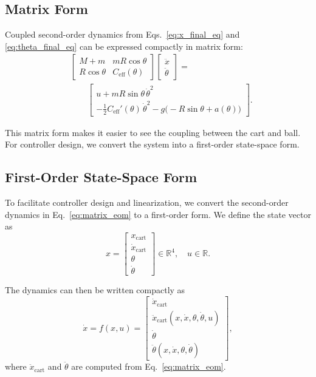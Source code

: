 \subsection{Matrix Form}
Coupled second-order dynamics from Eqs.~\eqref{eq:x_final_eq} and \eqref{eq:theta_final_eq} can be expressed compactly in matrix form:
\begin{equation}
\label{eq:matrix_eom}
\begin{split}
&\begin{bmatrix} 
M+m & m R \cos\theta \\[1ex] 
R \cos\theta & C_{\mathrm{eff}}(\theta)
\end{bmatrix}
\begin{bmatrix} \ddot x \\ \ddot\theta \end{bmatrix} = \\[4pt]
&\qquad
\begin{bmatrix} 
u + m R \sin\theta \,\dot\theta^2 \\[1ex] 
- \tfrac{1}{2} C_{\mathrm{eff}}'(\theta)\,\dot\theta^2 
- g\big(-R \sin\theta + a(\theta)\big)
\end{bmatrix}.
\end{split}
\end{equation}

This matrix form makes it easier to see the coupling between the cart and ball. For controller design, we convert the system into a first-order state-space form. 

\subsection{First-Order State-Space Form}

To facilitate controller design and linearization, we convert the second-order dynamics in Eq.~\eqref{eq:matrix_eom} to a first-order form. We define the state vector as
\begin{equation}
\label{eq:state_vector}
x = 
\begin{bmatrix}
x_\text{cart} \\ \dot{x}_\text{cart} \\ \theta \\ \dot{\theta}
\end{bmatrix} \in \mathbb{R}^4, \quad
u \in \mathbb{R}.
\end{equation}

The dynamics can then be written compactly as
\begin{equation}
\label{eq:first_order_dynamics}
\dot{x} = f(x,u) =
\begin{bmatrix}
\dot{x}_\text{cart} \\
\ddot{x}_\text{cart} (x, \dot{x}, \theta, \dot{\theta}, u) \\
\dot{\theta} \\
\ddot{\theta} (x, \dot{x}, \theta, \dot{\theta})
\end{bmatrix},
\end{equation}
where $\ddot{x}_\text{cart}$ and $\ddot{\theta}$ are computed from Eq.~\eqref{eq:matrix_eom}.

